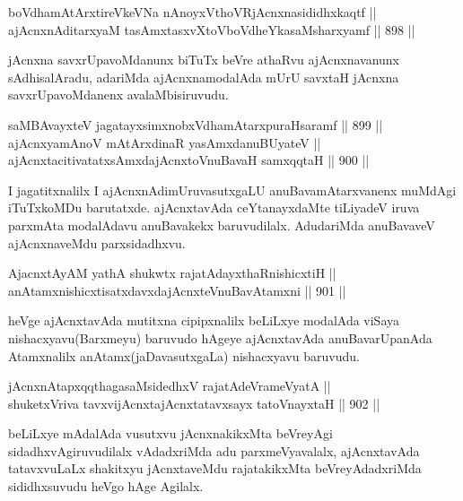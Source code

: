 
\begin{shl}
boVdhamAtArxtireVkeVNa nAnoyxV\s thoVR\s jAcnxnasididhxkaqtf || \\
ajAcnxnAditarxyaM tasAmxtasxvXtoVboVdheYkasaMsharxyamf \hfill || 898 ||  
\end{shl}

\begin{artha}
jAcnxna savxrUpavoMdanunx biTuTx beVre athaRvu ajAcnxnavanunx sAdhisalAradu, adariMda ajAcnxnamodalAda mUrU savxtaH jAcnxna savxrUpavoMdanenx avalaMbisiruvudu.
\end{artha}

\begin{shl}
saMBAvayxteV jagatayxsimxnobxVdhamAtarxpuraHsaramf \hfill || 899 || \\
ajAcnxyamAnoV mAtArxdinaR yasAmxdanuBUyateV || \\
ajAcnxtacitivatatxsAmxdajAcnxtoV\s nuBavaH samxqqtaH \hfill || 900 || 
\end{shl}

\begin{artha}
I jagatitxnalilx I ajAcnxnAdimUruvasutxgaLU anuBavamAtarxvanenx muMdAgi iTuTxkoMDu barutatxde. ajAcnxtavAda ceYtanayxdaMte tiLiyadeV iruva parxmAta modalAdavu anuBavakekx baruvudilalx. AdudariMda anuBavaveV ajAcnxnaveMdu parxsidadhxvu.
\end{artha}


\begin{shl}
AjacnxtAyAM yathA shukwtx rajatAdayxthaRnishicxtiH || \\
anAtamxnishicxtisatxdavxdajAcnxteV\s nuBavAtamxni \hfill || 901 ||  
\end{shl}

\begin{artha}
heVge ajAcnxtavAda mutitxna cipipxnalilx beLiLxye modalAda viSaya nishacxyavu(Barxmeyu) baruvudo hAgeye ajAcnxtavAda anuBavarUpanAda Atamxnalilx anAtamx(jaDavasutxgaLa) nishacxyavu baruvudu.
\end{artha}

\begin{shl}
jAcnxnAtapxqqthagasaMsidedhxV rajatAdeVrameVyatA || \\
shuketxVriva tavxvijAcnxtajAcnxtatavxsayx tatoV\s nayxtaH \hfill || 902 ||  
\end{shl}

\begin{artha}
beLiLxye mAdalAda vusutxvu jAcnxnakikxMta beVreyAgi sidadhxvAgiruvudilalx vAdadxriMda adu parxmeVyavalalx, ajAcnxtavAda tatavxvuLaLx shakitxyu jAcnxtaveMdu rajatakikxMta beVreyAdadxriMda sididhxsuvudu heVgo hAge Agilalx.
\end{artha}

